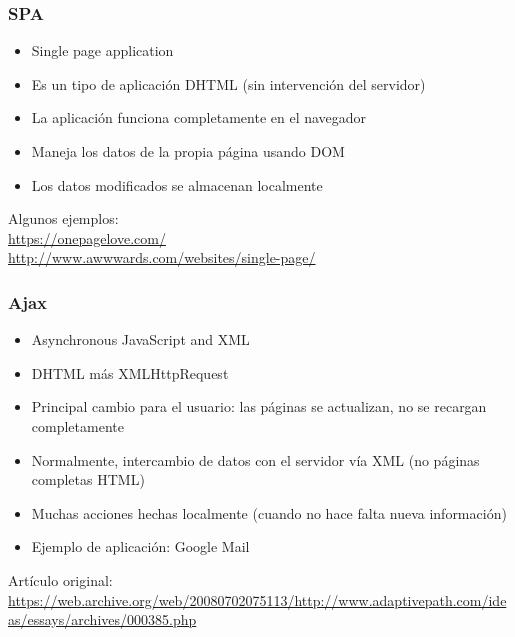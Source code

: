 \begin{frame}
\frametitle{SPA}

{\Large
\begin{itemize}
\item Single page application
\item Es un tipo de aplicación DHTML (sin intervención del servidor)
\item La aplicación funciona completamente en el navegador
\item Maneja los datos de la propia página usando DOM
\item Los datos modificados se almacenan localmente
\end{itemize}
}

\begin{flushright}
Algunos ejemplos: \\
\url{https://onepagelove.com/} \\
\url{http://www.awwwards.com/websites/single-page/} \\
\end{flushright}

\end{frame}


\begin{frame}
\frametitle{Ajax}

\begin{itemize}
\item Asynchronous JavaScript and XML
\item DHTML más XMLHttpRequest
\item Principal cambio para el usuario: las páginas se actualizan, no
  se recargan completamente
\item Normalmente, intercambio de datos con el servidor vía XML (no
  páginas completas HTML)
\item Muchas acciones hechas localmente (cuando no hace falta nueva
  información)
\item Ejemplo de aplicación: Google Mail
\end{itemize}

\begin{flushright}
Artículo original: \\
{ \footnotesize
\url{https://web.archive.org/web/20080702075113/http://www.adaptivepath.com/ideas/essays/archives/000385.php}
}
\end{flushright}
\end{frame}


